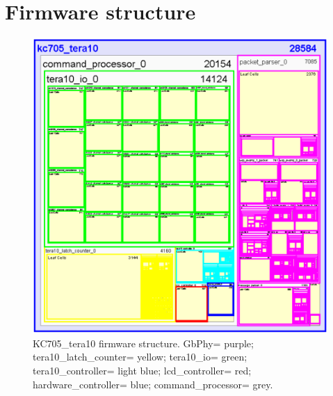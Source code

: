 \section{Firmware structure}
\noindent
\begin{figure}[H]
	\centering
	\includegraphics[width=0.45\linewidth]{IMG/ch4/HIERARCHY5}
	\caption{KC705\_tera10 firmware structure. GbPhy= purple; tera10\_latch\_counter= yellow; tera10\_io= green; tera10\_controller= light blue; lcd\_controller= red; hardware\_controller= blue; command\_processor= grey.}
	\label{fig:tera10}
\end{figure}

